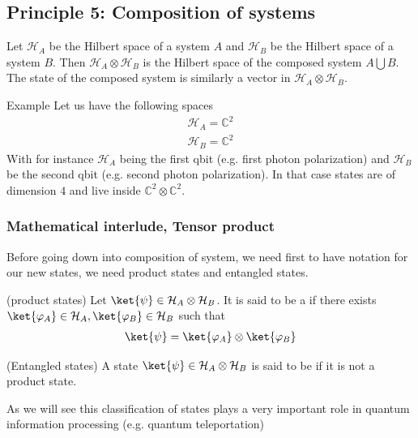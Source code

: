 \subsection{Principle 5: Composition of systems}
Let $\mathcal{H}_A$ be the Hilbert space of a system $A$ and $\mathcal{H}_B$ be the Hilbert space of a system $B$. Then $\mathcal{H}_A \otimes \mathcal{H}_B$ is the Hilbert space of the composed system $A \bigcup B$. The state of the composed system is  similarly a vector in $\mathcal{H}_A \otimes \mathcal{H}_B$.
\begin{parag}{Example}
    Let us have the following spaces
	\begin{align*} 
		\mathcal{H}_A = \mathbb{C}^2\\
		\mathcal{H}_B = \mathbb{C}^2
	\end{align*}
	With for instance $\mathcal{H}_A$ being the first qbit (e.g. first photon polarization) and $\mathcal{H}_B$ be the second qbit (e.g. second photon polarization). In that case states are of dimension $4$ and live inside $\mathbb{C}^2 \otimes \mathbb{C}^2$.
\end{parag}

\subsubsection{Mathematical interlude, Tensor product}
Before going down into composition of system, we need first to have notation for our new states, we need  product states and entangled states.
\begin{definition}{(product states)}
	Let $\ket{\psi} \in \mathcal{H}_A \otimes \mathcal{H}_B$. It is said to be a  if there exists $\ket{\varphi_A} \in \mathcal{H}_A, \ket{\varphi_B} \in \mathcal{H}_B$ such that 
	\begin{align*} 
		\ket{\psi} = \ket{\varphi_A} \otimes \ket{\varphi_B} 
	\end{align*}
\end{definition}


\begin{definition}{(Entangled states)}
A state $\ket{\psi} \in \mathcal{H}_A \otimes \mathcal{H}_B$ is said to be  if it is not a product state.
\end{definition}

As we will see this classification of states plays a very important role in quantum information processing (e.g. quantum teleportation)

